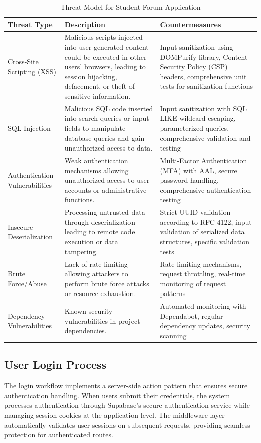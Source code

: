 \begin{table}[h]
\centering
\begin{tabular}{|p{3cm}|p{4cm}|p{5cm}|}
\hline
\textbf{Threat Type} & \textbf{Description} & \textbf{Countermeasures} \\
\hline
Cross-Site Scripting (XSS) & Malicious scripts injected into user-generated content could be executed in other users' browsers, leading to session hijacking, defacement, or theft of sensitive information. & Input sanitization using DOMPurify library, Content Security Policy (CSP) headers, comprehensive unit tests for sanitization functions \\
\hline
SQL Injection & Malicious SQL code inserted into search queries or input fields to manipulate database queries and gain unauthorized access to data. & Input sanitization with SQL LIKE wildcard escaping, parameterized queries, comprehensive validation and testing \\
\hline
Authentication Vulnerabilities & Weak authentication mechanisms allowing unauthorized access to user accounts or administrative functions. & Multi-Factor Authentication (MFA) with AAL, secure password handling, comprehensive authentication testing \\
\hline
Insecure Deserialization & Processing untrusted data through deserialization leading to remote code execution or data tampering. & Strict UUID validation according to RFC 4122, input validation of serialized data structures, specific validation tests \\
\hline
Brute Force/Abuse & Lack of rate limiting allowing attackers to perform brute force attacks or resource exhaustion. & Rate limiting mechanisms, request throttling, real-time monitoring of request patterns \\
\hline
Dependency Vulnerabilities & Known security vulnerabilities in project dependencies. & Automated monitoring with Dependabot, regular dependency updates, security scanning \\
\hline
\end{tabular}
\caption{Threat Model for Student Forum Application}
\label{tab:threat-model}
\end{table}

\subsection{User Login Process}

The login workflow implements a server-side action pattern that ensures secure authentication handling. When users submit their credentials, the system processes authentication through Supabase's secure authentication service while managing session cookies at the application level. The middleware layer automatically validates user sessions on subsequent requests, providing seamless protection for authenticated routes.

